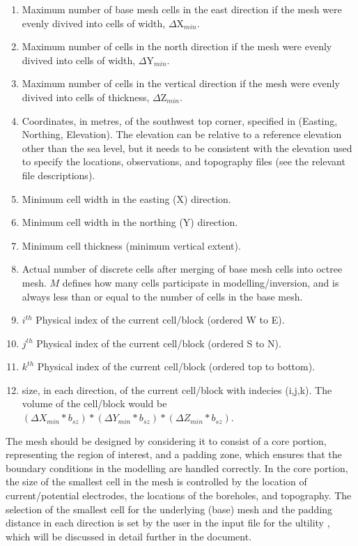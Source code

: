 \begin{enumerate}
\item[\codeName{NE}] Maximum number of base mesh cells in the east direction if the mesh were evenly divived into cells of width, $\Delta$X$_{min}$.
\item[\codeName{NN}] Maximum number of cells in the north direction if the mesh were evenly divived into cells of width, $\Delta$Y$_{min}$.
\item[\codeName{NZ}] Maximum number of cells in the vertical direction if the mesh were evenly divived into cells of thickness, $\Delta$Z$_{min}$.
\item[\codeName{E$_o$ N$_o$ Z$_o$}] Coordinates, in metres, of the southwest top corner, specified in (Easting, Northing, Elevation). The elevation can be relative to a reference elevation other than the sea level, but it needs to be consistent with the elevation used to specify the locations, observations, and topography files (see the relevant file descriptions).
\item[\codeName{$\Delta$X$_{min}$}] Minimum cell width in the easting (X) direction.
\item[\codeName{$\Delta$Y$_{min}$}] Minimum cell width in the northing (Y) direction.
\item[\codeName{$\Delta$Z$_{min}$}] Minimum cell thickness (minimum vertical extent).
\item[\codeName{$M$}] Actual number of discrete cells after merging of base mesh cells into octree mesh. $M$ defines how many cells participate in modelling/inversion, and is always less than or equal to the number of cells in the base mesh.
\item[\codeName{$i$}] $i^{th}$ Physical index of the current cell/block (ordered W to E).
\item[\codeName{$j$}] $j^{th}$ Physical index of the current cell/block (ordered S to N).
\item[\codeName{$k$}] $k^{th}$ Physical index of the current cell/block (ordered top to bottom).
\item[\codeName{$b_{sz}$}] size, in each direction, of the current cell/block with indecies (i,j,k). The volume of the cell/block would be $(\Delta X_{min}*b_{sz})*(\Delta Y_{min}*b_{sz})*(\Delta Z_{min}*b_{sz})$. 
\end{enumerate}

The mesh should be designed by considering it to consist of a core portion, representing the region of interest, and a padding zone, which ensures that the boundary conditions in the modelling are handled correctly. In the core portion, the size of the smallest cell in the mesh is controlled by the location of current/potential electrodes, the locations of the boreholes, and topography. The selection of the smallest cell for the underlying (base) mesh and the padding distance in each direction is set by the user in the input file for the ultility , which will be discussed in detail further in the document.


